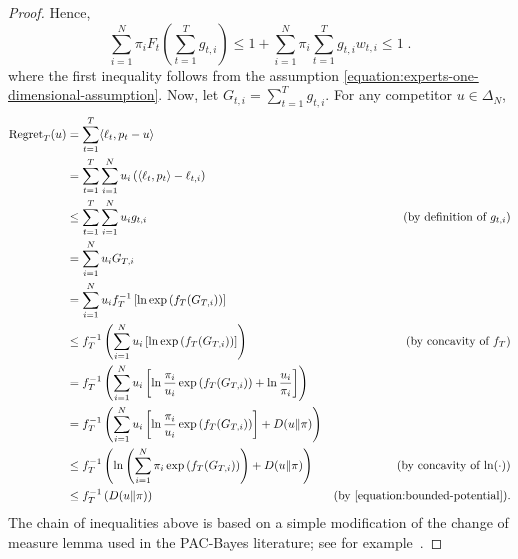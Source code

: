 \begin{proof}
Hence,
\begin{equation}
\label{equation:bounded-potential}
\sum_{i=1}^N  \pi_i F_t \left(\sum_{t=1}^T g_{t,i} \right) \le 1 + \sum_{i=1}^N \pi_i \sum_{t=1}^T  g_{t,i} w_{t,i} \le 1 \; .
\end{equation}
where the first inequality follows from the assumption \eqref{equation:experts-one-dimensional-assumption}.
Now, let $G_{t,i} = \sum_{t=1}^T g_{t,i}$. For any competitor $u \in \Delta_N$,
\begingroup
\allowdisplaybreaks
\begin{align*}
\allowdisplaybreaks
\Regret_T(u)
& = \sum_{t=1}^T \langle \ell_t, p_t - u \rangle \\
& = \sum_{t=1}^T \sum_{i=1}^N u_i \left( \langle \ell_t, p_t \rangle - \ell_{t,i} \right) \\
& \le \sum_{t=1}^T \sum_{i=1}^N u_i g_{t,i} & \text{(by definition of $g_{t,i}$)} \\
& = \sum_{i=1}^N u_i G_{T,i} \\
& = \sum_{i=1}^N u_i f_T^{-1}\left[\ln \exp\left(f_T(G_{T,i})\right)\right] \\
& \le f_T^{-1}\left(\sum_{i=1}^N u_i \left[\ln \exp\left(f_T(G_{T,i})\right)\right]\right) & \text{(by concavity of $f_T$)} \\
& = f_T^{-1}\left(\sum_{i=1}^N u_i \left[\ln \frac{\pi_i}{u_i}\exp\left(f_T(G_{T,i})\right)+ \ln\frac{u_i}{\pi_i}\right]\right) \\
& = f_T^{-1}\left(\sum_{i=1}^N u_i \left[\ln \frac{\pi_i}{u_i}\exp\left(f_T(G_{T,i})\right)\right] + \KL{u}{\pi}\right) \\
& \le f_T^{-1}\left(\ln \left(\sum_{i=1}^N \pi_i \exp\left(f_T(G_{T,i})\right) \right) + \KL{u}{\pi}\right) & \text{(by concavity of $\ln(\cdot)$)} \\
& \le f_T^{-1}\left(\KL{u}{\pi}\right) & \text{(by \eqref{equation:bounded-potential})}.
\end{align*}
\endgroup
The chain of inequalities above is based on a simple modification of the change
of measure lemma used in the PAC-Bayes literature; see for
example~\citet{McAllester13}.
\end{proof}
